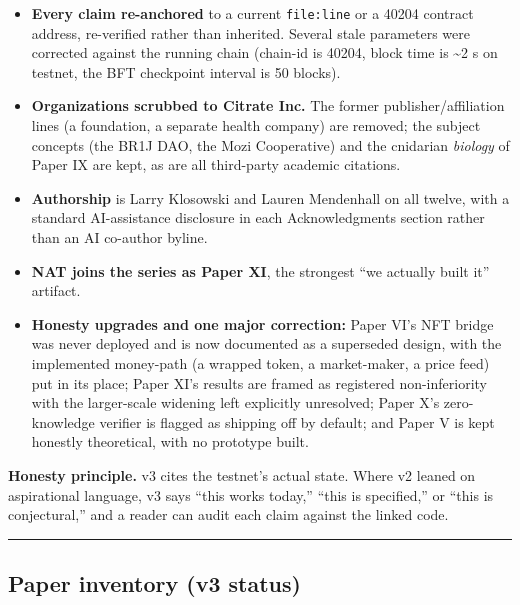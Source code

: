 \begin{itemize}
\tightlist
\item
  \textbf{Every claim re-anchored} to a current \texttt{file:line} or a
  40204 contract address, re-verified rather than inherited. Several
  stale parameters were corrected against the running chain (chain-id is
  40204, block time is \textasciitilde2 s on testnet, the BFT checkpoint
  interval is 50 blocks).
\item
  \textbf{Organizations scrubbed to Citrate Inc.} The former
  publisher/affiliation lines (a foundation, a separate health company)
  are removed; the subject concepts (the BR1J DAO, the Mozi Cooperative)
  and the cnidarian \emph{biology} of Paper IX are kept, as are all
  third-party academic citations.
\item
  \textbf{Authorship} is Larry Klosowski and Lauren Mendenhall on all
  twelve, with a standard AI-assistance disclosure in each
  Acknowledgments section rather than an AI co-author byline.
\item
  \textbf{NAT joins the series as Paper XI}, the strongest ``we actually
  built it'' artifact.
\item
  \textbf{Honesty upgrades and one major correction:} Paper VI's NFT
  bridge was never deployed and is now documented as a superseded
  design, with the implemented money-path (a wrapped token, a
  market-maker, a price feed) put in its place; Paper XI's results are
  framed as registered non-inferiority with the larger-scale widening
  left explicitly unresolved; Paper X's zero-knowledge verifier is
  flagged as shipping off by default; and Paper V is kept honestly
  theoretical, with no prototype built.
\end{itemize}

\textbf{Honesty principle.} v3 cites the testnet's actual state. Where
v2 leaned on aspirational language, v3 says ``this works today,'' ``this
is specified,'' or ``this is conjectural,'' and a reader can audit each
claim against the linked code.

\begin{center}\rule{0.5\linewidth}{0.5pt}\end{center}

\subsection{Paper inventory (v3
status)}\label{paper-inventory-v3-status}

